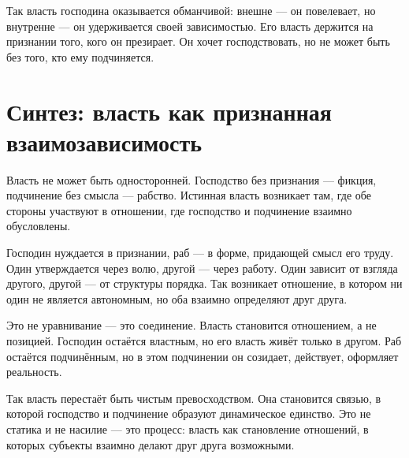 Так власть господина оказывается обманчивой: внешне — он повелевает, но внутренне — он удерживается своей зависимостью. Его власть держится на признании того, кого он презирает. Он хочет господствовать, но не может быть без того, кто ему подчиняется.

\section{Синтез: власть как признанная взаимозависимость}

Власть не может быть односторонней. Господство без признания — фикция, подчинение без смысла — рабство. Истинная власть возникает там, где обе стороны участвуют в отношении, где господство и подчинение взаимно обусловлены.

Господин нуждается в признании, раб — в форме, придающей смысл его труду. Один утверждается через волю, другой — через работу. Один зависит от взгляда другого, другой — от структуры порядка. Так возникает отношение, в котором ни один не является автономным, но оба взаимно определяют друг друга.

Это не уравнивание — это соединение. Власть становится отношением, а не позицией. Господин остаётся властным, но его власть живёт только в другом. Раб остаётся подчинённым, но в этом подчинении он созидает, действует, оформляет реальность.

Так власть перестаёт быть чистым превосходством. Она становится связью, в которой господство и подчинение образуют динамическое единство. Это не статика и не насилие — это процесс: власть как становление отношений, в которых субъекты взаимно делают друг друга возможными.
